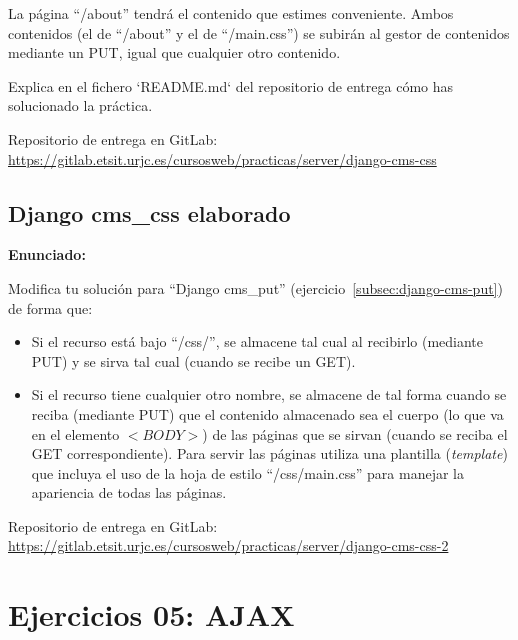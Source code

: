 La página ``/about'' tendrá el contenido que estimes conveniente. Ambos contenidos (el de ``/about'' y el de ``/main.css'') se subirán al gestor de contenidos mediante un PUT, igual que cualquier otro contenido.

Explica en el fichero `README.md` del repositorio de entrega cómo has solucionado la práctica.

Repositorio de entrega en GitLab: \\
\url{https://gitlab.etsit.urjc.es/cursosweb/practicas/server/django-cms-css}

\subsection{Django cms\_css elaborado}
\label{subsec:django-cms-css-2}

\textbf{Enunciado:}

Modifica tu solución para ``Django cms\_put'' (ejercicio~\ref{subsec:django-cms-put}) de forma que:

\begin{itemize}
\item Si el recurso está bajo ``/css/'', se almacene tal cual al recibirlo (mediante PUT) y se sirva tal cual (cuando se recibe un GET).
\item Si el recurso tiene cualquier otro nombre, se almacene de tal forma cuando se reciba (mediante PUT) que el contenido almacenado sea el cuerpo (lo que va en el elemento $<BODY>$) de las páginas que se sirvan (cuando se reciba el GET correspondiente). Para servir las páginas utiliza una plantilla (\emph{template}) que incluya el uso de la hoja de estilo ``/css/main.css'' para manejar la apariencia de todas las páginas.
\end{itemize}

Repositorio de entrega en GitLab: \\
\url{https://gitlab.etsit.urjc.es/cursosweb/practicas/server/django-cms-css-2}

\section{Ejercicios 05: AJAX}

